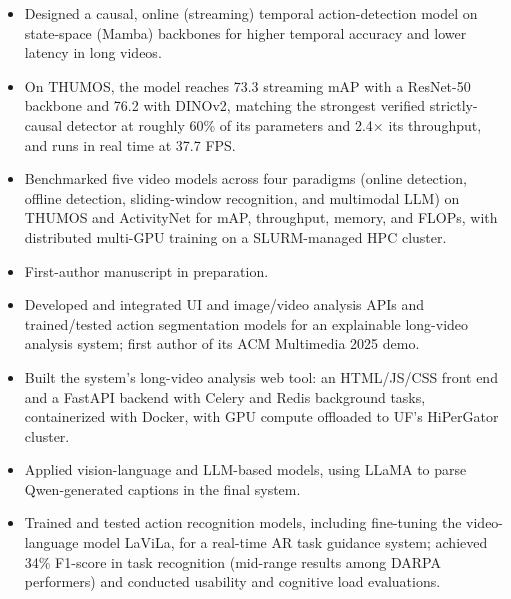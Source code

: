 \begin{itemize}
\item Designed a causal, online (streaming) temporal action-detection model on state-space (Mamba) backbones for higher temporal accuracy and lower latency in long videos.
\item On THUMOS, the model reaches 73.3 streaming mAP with a ResNet-50 backbone and 76.2 with DINOv2, matching the strongest verified strictly-causal detector at roughly 60\% of its parameters and 2.4× its throughput, and runs in real time at 37.7 FPS.
\item Benchmarked five video models across four paradigms (online detection, offline detection, sliding-window recognition, and multimodal LLM) on THUMOS and ActivityNet for mAP, throughput, memory, and FLOPs, with distributed multi-GPU training on a SLURM-managed HPC cluster.
\item First-author manuscript in preparation.
\end{itemize}
\begin{itemize}
\item Developed and integrated UI and image/video analysis APIs and trained/tested action segmentation models for an explainable long-video analysis system; first author of its ACM Multimedia 2025 demo.
\item Built the system's long-video analysis web tool: an HTML/JS/CSS front end and a FastAPI backend with Celery and Redis background tasks, containerized with Docker, with GPU compute offloaded to UF's HiPerGator cluster.
\item Applied vision-language and LLM-based models, using LLaMA to parse Qwen-generated captions in the final system.
\end{itemize}
\begin{itemize}
\item Trained and tested action recognition models, including fine-tuning the video-language model LaViLa, for a real-time AR task guidance system; achieved 34\% F1-score in task recognition (mid-range results among DARPA performers) and conducted usability and cognitive load evaluations.
\end{itemize}
